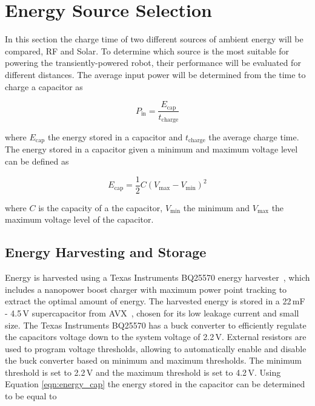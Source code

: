 \section{Energy Source Selection}
\label{sec:pre_energy_source_selection}

In this section the charge time of two different sources of ambient energy will be compared, RF and Solar.
To determine which source is the most suitable for powering the transiently-powered robot, their performance will be evaluated for different distances.
The average input power will be determined from the time to charge a capacitor as

\begin{equation}
	P_{\text{in}} = \frac{E_{\text{cap}}}{t_{\text{charge}}}
\end{equation}

\noindent
where $E_{\text{cap}}$ the energy stored in a capacitor and $t_{\text{charge}}$ the average charge time.
The energy stored in a capacitor given a minimum and maximum voltage level can be defined as

\begin{equation}
\label{eqn:energy_cap}
	E_{\text{cap}} = \frac{1}{2}C(V_{\max} - V_{\min})^{2}
\end{equation}

\noindent
where $C$ is the capacity of a the capacitor, $V_{\min}$ the minimum and $V_{\max}$ the maximum voltage level of the capacitor.

\subsection{Energy Harvesting and Storage}
\label{sec:pre_energy_harvesting_storage}
Energy is harvested using a Texas Instruments BQ25570 energy harvester~\cite{bq25570_2017}, which includes a nanopower boost charger with maximum power point tracking to extract the optimal amount of energy. 
The harvested energy is stored in a 22\,mF - 4.5\,V supercapacitor from AVX~\cite{avx_bestcap_2017}, chosen for its low leakage current and small size.
The Texas Instruments BQ25570 has a buck converter to efficiently regulate the capacitors voltage down to the system voltage of 2.2\,V.
External resistors are used to program voltage thresholds, allowing to automatically enable and disable the buck converter based on minimum and maximum thresholds.
The minimum threshold is set to 2.2\,V and the maximum threshold is set to 4.2\,V.
Using Equation \ref{eqn:energy_cap} the energy stored in the capacitor can be determined to be equal to

